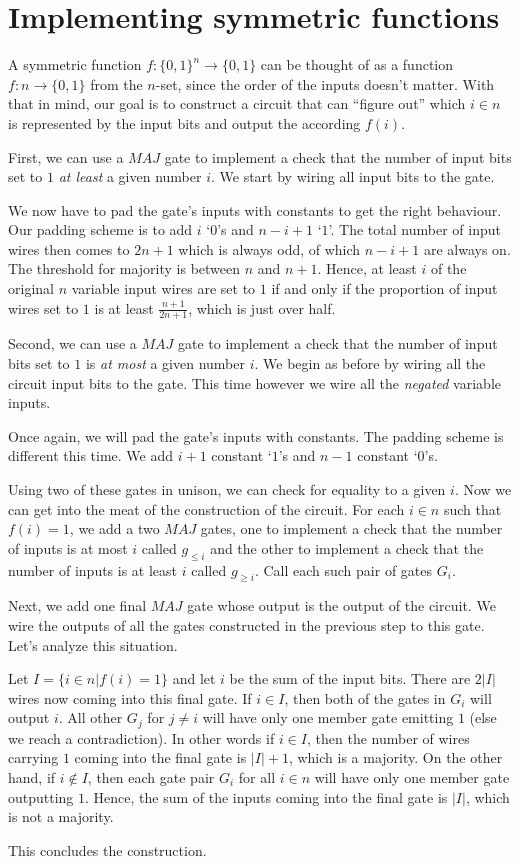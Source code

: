 \documentclass[11pt,letterpaper]{article}
\begin{document}
\section{Implementing symmetric functions}

A symmetric function $f : \{0, 1\}^n \to \{0, 1\}$ can be thought of as a
function $f : n \to \{0, 1\}$ from the $n$-set, since the order of the inputs
doesn't matter. With that in mind, our goal is to construct a circuit that can
``figure out'' which $i \in n$ is represented by the input bits and output the
according $f(i)$.

First, we can use a $MAJ$ gate to implement a check that the number of input
bits set to $1$ \emph{at least} a given number $i$. We start by wiring all
input bits to the gate.

We now have to pad the gate's inputs with constants to get the right behaviour.
Our padding scheme is to add $i$ `$0$'s and $n - i + 1$ `$1$'. The total number
of input wires then comes to $2n + 1$ which is always odd, of which $n - i + 1$
are always on. The threshold for majority is between $n$ and $n+1$. Hence, at
least $i$ of the original $n$ variable input wires are set to $1$ if and only
if the proportion of input wires set to $1$ is at least $\frac{n + 1}{2n + 1}$,
which is just over half.

Second, we can use a $MAJ$ gate to implement a check that the number of input
bits set to $1$ is \emph{at most} a given number $i$. We begin as before by
wiring all the circuit input bits to the gate. This time however we wire all
the \emph{negated} variable inputs.

Once again, we will pad the gate's inputs with constants. The padding scheme is
different this time. We add $i + 1$ constant `$1$'s and $n - 1$ constant
`$0$'s.

Using two of these gates in unison, we can check for equality to a given $i$.
Now we can get into the meat of the construction of the circuit. For each $i
\in n$ such that $f(i) = 1$, we add a two $MAJ$ gates, one to implement a check
that the number of inputs is at most $i$ called $g_{\leq i}$ and the other to
implement a check that the number of inputs is at least $i$ called
$g_{\geq i}$. Call each such pair of gates $G_i$.

Next, we add one final $MAJ$ gate whose output is the output of the circuit. We
wire the outputs of all the gates constructed in the previous step to this
gate. Let's analyze this situation.

Let $I = \{i \in n | f(i) = 1\}$ and let $i$ be the sum of the input bits.
There are $2|I|$ wires now coming into this final gate.
If $i \in I$, then both of the gates in $G_i$ will output $i$. All other $G_j$
for $j \neq i$ will have only one member gate emitting $1$ (else we reach a
contradiction). In other words if $i \in I$, then the number of wires carrying
$1$ coming into the final gate is $|I| + 1$, which is a majority.
On the other hand, if $i \notin I$, then each gate pair $G_i$ for all $i \in n$
will have only one member gate outputting $1$. Hence, the sum of the inputs
coming into the final gate is $|I|$, which is not a majority.

This concludes the construction.
\end{document}
